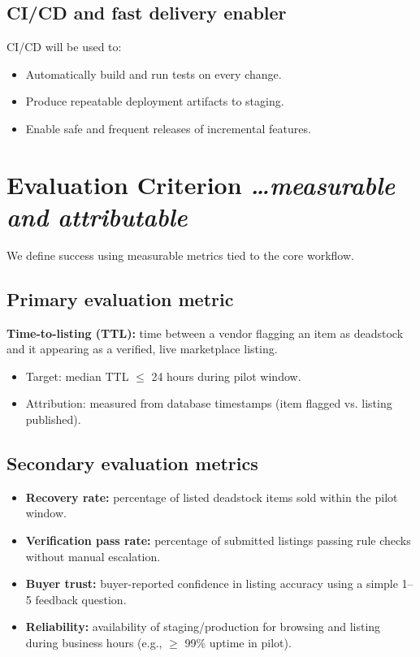 \documentclass[11pt,a4paper]{article}
\newcommand{\BvrHint}[1]{%
  {\normalfont\normalsize\itshape\hfill #1}}
\begin{document}
\subsection{CI/CD and fast delivery enabler}
CI/CD will be used to:
\begin{itemize}[leftmargin=0.7cm]
    \item Automatically build and run tests on every change.
    \item Produce repeatable deployment artifacts to staging.
    \item Enable safe and frequent releases of incremental features.
\end{itemize}

\section{Evaluation Criterion %
\BvrHint{\ldots measurable and attributable}}
We define success using measurable metrics tied to the
core workflow.

\subsection{Primary evaluation metric}
\textbf{Time-to-listing (TTL):} time between a vendor
flagging an item as deadstock and it appearing as a
verified, live marketplace listing.
\begin{itemize}[leftmargin=0.7cm]
    \item Target: median TTL $\le$ 24 hours during pilot window.
    \item Attribution: measured from database timestamps (item flagged vs. listing published).
\end{itemize}

\subsection{Secondary evaluation metrics}
\begin{itemize}[leftmargin=0.7cm]
    \item \textbf{Recovery rate:} percentage of listed deadstock items sold within the pilot window.
    \item \textbf{Verification pass rate:} percentage of submitted listings passing rule checks without manual escalation.
    \item \textbf{Buyer trust:} buyer-reported confidence in listing accuracy using a simple 1--5 feedback question.
    \item \textbf{Reliability:} availability of staging/production for browsing and listing during business hours (e.g., $\ge$ 99\% uptime in pilot).
\end{itemize}
\end{document}

